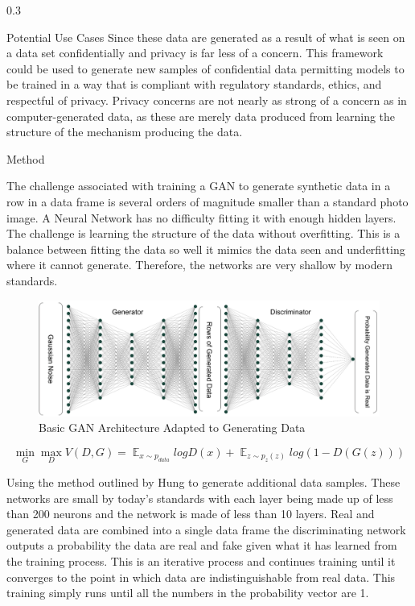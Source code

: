 \documentclass{msuposter}
\newcommand{\colwidth}{0.3\linewidth}
\begin{document}
\begin{frame}{}
\begin{columns}[t]
\begin{column}{\colwidth}
\begin{block}{Potential Use Cases}
Since these data are generated as a result of what is seen on a data set confidentially and privacy is far less of a concern. This framework could be used to generate new samples of confidential data permitting models to be trained in a way that is compliant with regulatory standards, ethics, and respectful of privacy. Privacy concerns are not nearly as strong of a concern as in computer-generated data, as these are merely data produced from learning the structure of the mechanism producing the data. 



\end{block}

\begin{block}{Method}

The challenge associated with training a GAN to generate synthetic data in a row in a data frame is several orders of magnitude smaller than a standard photo image. A Neural Network has no difficulty fitting it with enough hidden layers. The challenge is learning the structure of the data without overfitting. This is a balance between fitting the data so well it mimics the data seen and underfitting where it cannot generate. Therefore, the networks are very shallow by modern standards. 


\begin{figure}
  \includegraphics[width=\linewidth]{gan_diag.png}
    	\caption{\label{fig:my-label} Basic GAN Architecture Adapted to Generating Data}
\end{figure}

$$
\min_{G} \max_{D} V(D, G) = \mathop{\mathbb{E}}_{x \sim p_{data}} logD(x) + \mathop{\mathbb{E}}_{z \sim p_{z}(z)}log(1-D(G(z)))
$$

Using the method outlined by Hung \cite{hung} to generate additional data samples. These networks are small by today's standards with each layer being made up of less than 200 neurons and the network is made of less than 10 layers. Real and generated data are combined into a single data frame the discriminating network outputs a probability the data are real and fake given what it has learned from the training process. This is an iterative process and continues training until it converges to the point in which data are indistinguishable from real data. This training simply runs until all the numbers in the probability vector are 1.



\end{block}
\end{column}
\end{columns}
\end{frame}
\end{document}
